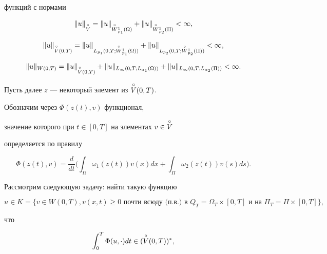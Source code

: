 функций с нормами 


$$ 


\|u\|_{\oc V} = \|u\|_{\oc W{}^1_{p_1}(\Omega)}+ 


\|u\|_{\oc W{}^1_{p_2}(\Pi)} < \infty, 


$$ 


$$ 


\|u\|_{\oc V(0,T)} = 


\|u\|_{L_{p_1}(0,T;\oc W{}^1_{p_1}(\Omega))}+ 


\|u\|_{L_{p_2}(0,T;\oc W{}^1_{p_2}(\Pi))} < \infty, 


$$ 


% 


$$ 


\|u\|_{W(0,T)} = \|u\|_{\oc V(0,T)}+ 


\|u\|_{L_{\infty}(0,T;L_{\alpha_1}(\Omega))}+ 


\|u\|_{L_{\infty}(0,T;L_{\alpha_2}(\Pi))} < \infty. 


$$ 


Пусть далее $z$ --- некоторый элемент из $\overset{\circ} V(0,T)$. 


Обозначим через $\Phi(z(t),v)$ функционал, 


значение которого при $t\in [0,T]$ на элементах $v\in \overset{\circ} V$ 


определяется по правилу 


$$ 


\Phi(z(t),v) = \frac{d}{dt}\biggl( \int_{\Omega}\omega_1(z(t))v(x)dx+ 


\int_{\Pi}\omega_2(z(t))v(s)ds\biggr). 


$$ 


 


Рассмотрим следующую задачу: найти такую функцию 


$$ 


u\in K = \{v\in W(0,T), v(x,t)\ge 0 \text{ почти всюду (п.в.) в } 


Q_T=\Omega_T\times[0,T] 


\text{ и на }\Pi_T=\Pi\times[0,T]\}, 


$$


что 


\begin{equation} 


\int^T_0 \Phi(u,\cdot)dt\in(\oc V(0,T))^*, 


\end{equation} 


% 


